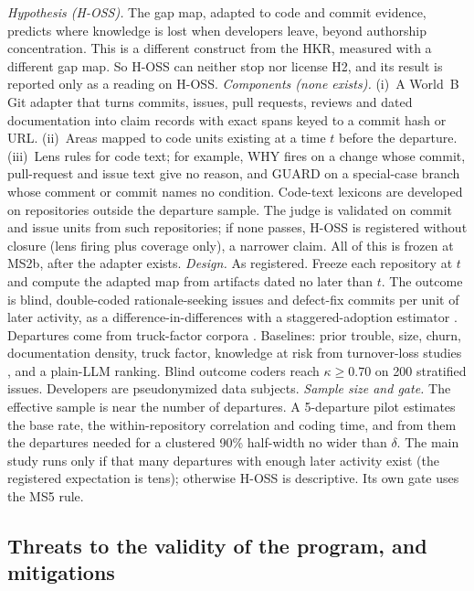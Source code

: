 \emph{Hypothesis (H-OSS).} The gap map, adapted to code and commit evidence, predicts where
knowledge is lost when developers leave, beyond authorship concentration. \evint{} This is a
different construct from the HKR, measured with a different gap map. So H-OSS can neither stop
nor license H2, and its result is reported only as a reading on H-OSS.
\emph{Components (none exists).} (i)~A World~B Git adapter that turns commits, issues, pull
requests, reviews and dated documentation into claim records with exact spans keyed to a commit
hash or URL. (ii)~Areas mapped to code units existing at a time $t$ before
the departure. (iii)~Lens rules for code text; for example, WHY fires on a change whose commit, pull-request
and issue text give no reason, and GUARD on a special-case branch whose comment or commit names no
condition. Code-text lexicons are developed on repositories outside the
departure sample. The judge is validated on commit and issue units from such repositories; if none
passes, H-OSS is registered without closure (lens firing plus coverage only), a narrower claim.
All of this is frozen at MS2b, after the adapter exists.
\emph{Design.} As registered. Freeze each repository at $t$ and compute the adapted map from
artifacts dated no later than $t$. The outcome is blind, double-coded rationale-seeking
issues and defect-fix commits per unit of later activity, as a difference-in-differences with a
staggered-adoption estimator \parencite{callaway2021difference}. Departures come from truck-factor corpora
\parencite{avelino2016novel,avelino2019abandonment}. Baselines: prior trouble, size, churn,
documentation density, truck factor, knowledge at risk from turnover-loss studies
\parencite{rigby2016quantifying,nassif2017revisiting}, and a plain-LLM ranking. Blind outcome
coders reach $\kappa \geq 0.70$ on 200 stratified issues. Developers are pseudonymized data
subjects.
\emph{Sample size and gate.} The effective sample is near the number of departures. A 5-departure
pilot estimates the base rate, the within-repository correlation and coding time, and from them the
departures needed for a clustered 90\% half-width no wider than $\delta$. The main study runs only
if that many departures with enough later activity exist (the registered expectation is tens);
otherwise H-OSS is descriptive. Its own gate uses the MS5 rule.

\subsection{Threats to the validity of the program, and mitigations}

